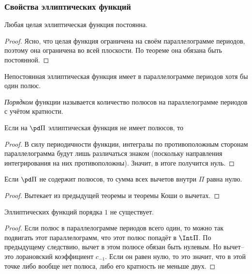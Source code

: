 \documentclass[a4paper]{article}
\begin{document}
\subsubsection{Свойства эллиптических функций}

\begin{theorem}
Любая целая эллиптическая функция постоянна.
\end{theorem}
\begin{proof}
Ясно, что целая функция ограничена на своём параллелограмме периодов, поэтому она ограничена
во всей плоскости. По теореме она обязана быть постоянной.
\end{proof}

\begin{imp}
Непостоянная эллиптическая функция имеет в параллелограмме периодов хотя бы один полюс.
\end{imp}

\begin{df}
\emph{Порядком} функции называется количество полюсов на параллелограмме периодов с учётом кратности.
\end{df}

\begin{theorem}
Если на $\pd \Pi$ эллиптическая функция не имеет полюсов, то
\end{theorem}
\begin{proof}
В силу периодичности функции, интегралы по противоположным сторонам параллелограмма
будут лишь различаться знаком (поскольку направления интегрирования на них противоположны).
Значит, в итоге получится нуль.
\end{proof}

\begin{imp}
Если $\pd \Pi$ не содержит полюсов, то сумма всех вычетов внутри $\Pi$ равна нулю.
\end{imp}
\begin{proof}
Вытекает из предыдущей теоремы и теоремы Коши о вычетах.
\end{proof}

\begin{imp}
Эллиптических функций порядка $1$ не существует.
\end{imp}
\begin{proof}
Если полюс в параллелограмме периодов всего один, то можно так подвигать этот параллелограмм,
что этот полюс попадёт в $\Int \Pi$. По предыдущему следствию, вычет в этом полюсе обязан быть нулевым.
Но вычет-- это лорановский коэффициент $c_{-1}$. Если он равен нулю, то это значит,
что в этой точке либо вообще нет полюса, либо его кратность не меньше двух.
\end{proof}
\end{document}

